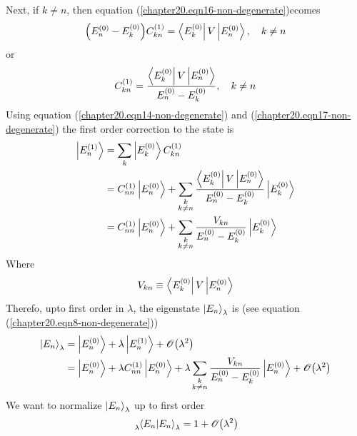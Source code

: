 Next, if $k \neq n$, then equation (\ref{chapter20.eqn16-non-degenerate})ecomes
\begin{equation}
\qty(E_n^{(0)} -  E_{k}^{(0)}) C_{k n}^{(1)} = \bra{E_k^{(0)}} V \ket{E_n^{(0)}} , \quad k \neq n
\end{equation}
or
\begin{equation}
	C_{k n}^{(1)} =  \frac{\bra{E_k^{(0)}} V \ket{E_n^{(0)}}}{E_n^{(0)} -  E_{k}^{(0)}} , \quad k \neq n
	\label{chapter20.eqn17-non-degenerate}
\end{equation}
Using equation (\ref{chapter20.eqn14-non-degenerate}) and (\ref{chapter20.eqn17-non-degenerate}) the first order correction to the state is
\begin{align}
	\ket{E_{n}^{(1)}} 
	&= \sum_{k} \ket{E_k^{(0)}} C^{(1)}_{k n} \\
	\label{chapter20.eqn18-non-degenerate}
	&= C^{(1)}_{n n} \ket{E_{n}^{(0)}}  + \sum_{\substack{k \\ k \neq n}} \frac{\bra{E_k^{(0)}} V \ket{E_n^{(0)}}}{E_n^{(0)} -  E_{k}^{(0)}} \ket{E_k^{(0)}} \\
	\label{chapter20.eqn19-non-degenerate}
	&= C^{(1)}_{n n} \ket{E_{n}^{(0)}}  + \sum_{\substack{k \\ k \neq n}} \frac{V_{k n}}{E_n^{(0)} -  E_{k}^{(0)}} \ket{E_k^{(0)}}
\end{align}
	Where
	\begin{equation}
		V_{k n} \equiv \bra{E_k^{(0)}} V \ket{E_n^{(0)}}
	\end{equation}
	Therefo, upto first order in $\lambda$, the eigenstate $\ket{E_{n}}_\lambda$ is (see equation (\ref{chapter20.eqn8-non-degenerate}))
	\begin{align}
		\ket{E_n}_\lambda 
		&= \ket{E_n^{(0)}} + \lambda \ket{E_n^{(1)}} + \order{\lambda^2} \\
		\label{chapter20.eqn20-non-degenerate}
		&= \ket{E_n^{(0)}} + \lambda C^{(1)}_{n n} \ket{E_n^{(0)}} + \lambda \sum_{\substack{k \\ k \neq n}} \frac{V_{k n}}{E_n^{(0)} -  E_{k}^{(0)}} \ket{E_n^{(0)}} + \order{\lambda^2}
	\end{align}
	We want to normalize $\ket{E_n}_\lambda$ up to first order 
	\begin{equation}
		\tensor*[_{\lambda}]{\braket{E_n}{E_n}}{_{\lambda}} = 1 + \order{\lambda^2}
	\end{equation}
